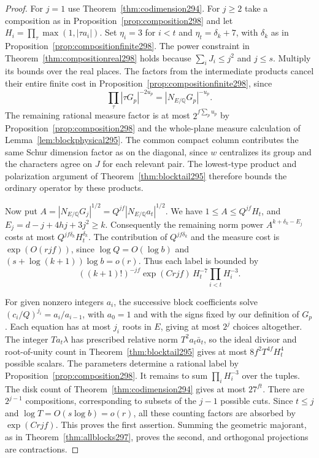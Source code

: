 \documentclass[a4paper,11pt]{article}
\theoremstyle{definition}
\theoremstyle{remark}
\numberwithin{equation}{section}
\begin{document}
\begin{proof}
For \(j=1\) use Theorem~\ref{thm:codimension294}.
For \(j\ge2\) take a composition as in
Proposition~\ref{prop:composition298} and let
\(H_i=\prod_\tau\max(1,|\tau a_i|)\). Set \(\eta_i=3\)
for \(i<t\) and \(\eta_t=\delta_k+7\), with \(\delta_k\)
as in Proposition~\ref{prop:compositionfinite298}.
The power constraint in Theorem~\ref{thm:compositionreal298}
holds because \(\sum_i J_i\le j^2\) and \(j\le s\).
Multiply its bounds over the real places. The factors
from the intermediate products cancel their entire finite
cost in Proposition~\ref{prop:compositionfinite298}, since
\[
        \prod_\tau|\tau G_p|^{-2u_p}
                          = |N_{E/\mathbb Q}G_p|^{-u_p}.
\]
The remaining rational measure factor is at most
\(2^{f\sum_p u_p}\) by Proposition~\ref{prop:composition298}
and the whole-plane measure calculation of
Lemma~\ref{lem:blockphysical295}. The common compact
column contributes the same Schur dimension factor as
on the diagonal, since \(w\) centralizes its group and
the characters agree on \(J\) for each relevant pair.
The lowest-type product and polarization argument of
Theorem~\ref{thm:blocktail295} therefore bounds the
ordinary operator by these products.

Now put \(A=|N_{E/\mathbb Q}G_j|^{1/2}
=Q^{jf}|N_{E/\mathbb Q}a_t|^{1/2}\). We have
\(1\le A\le Q^{jf}H_t\), and \(E_j=d-j+4hj+3j^2\ge k\).
Consequently the remaining norm power
\(A^{k+\delta_k-E_j}\) costs at most \(Q^{jf\delta_k}H_t^{\delta_k}\).
The contribution of \(Q^{jf\delta_k}\) and the measure cost
is \(\exp(O(rjf))\), since \(\log Q=O(\log b)\) and
\((s+\log(k+1))\log b=o(r)\). Thus each label is bounded by
\[
      ((k+1)!)^{-jf}\exp(Crjf)\,
               H_t^{-7}\prod_{i<t}H_i^{-3}.
\]

For given nonzero integers \(a_i\), the successive block
coefficients solve
\((c_i/Q)^{j_i}=a_i/a_{i-1}\), with \(a_0=1\) and with
the signs fixed by our definition of \(G_p\). Each equation
has at most \(j_i\) roots in \(E\), giving at most \(2^j\)
choices altogether. The integer \(Ta_t\lambda\) has
prescribed relative norm \(T^2 a_t\bar a_t\), so the ideal
divisor and root-of-unity count in
Theorem~\ref{thm:blocktail295} gives at most
\(8f^2 T^{4f}H_t^4\) possible scalars. The parameters
determine a rational label by Proposition~\ref{prop:composition298}.
It remains to sum \(\prod_i H_i^{-3}\) over the tuples.
The disk count of Theorem~\ref{thm:codimension294} gives
at most \(27^{ft}\). There are \(2^{j-1}\) compositions,
corresponding to subsets of the \(j-1\) possible cuts.
Since \(t\le j\) and \(\log T=O(s\log b)=o(r)\), all
these counting factors are absorbed by \(\exp(Crjf)\).
This proves the first assertion. Summing the geometric
majorant, as in Theorem~\ref{thm:allblocks297}, proves
the second, and orthogonal projections are contractions.
\end{proof}
\end{document}
